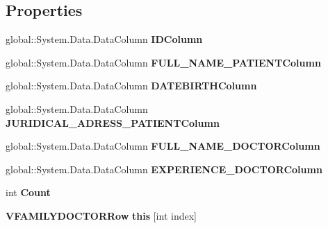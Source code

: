 \subsection*{Properties}
\begin{CompactItemize}
\item 
global::System.Data.DataColumn \textbf{IDColumn}\hspace{0.3cm}{\tt  [get]}\label{class_automatic_medical_system_1_1_data_set2_1_1_v_f_a_m_i_l_y_d_o_c_t_o_r_data_table_41c9dea202f3c850946c823c481c691f}

\item 
global::System.Data.DataColumn \textbf{FULL\_\-NAME\_\-PATIENTColumn}\hspace{0.3cm}{\tt  [get]}\label{class_automatic_medical_system_1_1_data_set2_1_1_v_f_a_m_i_l_y_d_o_c_t_o_r_data_table_852202fdb684abc22d7af9d01edefa8e}

\item 
global::System.Data.DataColumn \textbf{DATEBIRTHColumn}\hspace{0.3cm}{\tt  [get]}\label{class_automatic_medical_system_1_1_data_set2_1_1_v_f_a_m_i_l_y_d_o_c_t_o_r_data_table_1cf4543a4d2cf4f3832d5fba2c204aef}

\item 
global::System.Data.DataColumn \textbf{JURIDICAL\_\-ADRESS\_\-PATIENTColumn}\hspace{0.3cm}{\tt  [get]}\label{class_automatic_medical_system_1_1_data_set2_1_1_v_f_a_m_i_l_y_d_o_c_t_o_r_data_table_31857358c912dbd76e422b8741008e0d}

\item 
global::System.Data.DataColumn \textbf{FULL\_\-NAME\_\-DOCTORColumn}\hspace{0.3cm}{\tt  [get]}\label{class_automatic_medical_system_1_1_data_set2_1_1_v_f_a_m_i_l_y_d_o_c_t_o_r_data_table_265f9f9138ef8aa4b6fe371ad16719f9}

\item 
global::System.Data.DataColumn \textbf{EXPERIENCE\_\-DOCTORColumn}\hspace{0.3cm}{\tt  [get]}\label{class_automatic_medical_system_1_1_data_set2_1_1_v_f_a_m_i_l_y_d_o_c_t_o_r_data_table_168195e6598ed3f6b8410a1762f9fc86}

\item 
int \textbf{Count}\hspace{0.3cm}{\tt  [get]}\label{class_automatic_medical_system_1_1_data_set2_1_1_v_f_a_m_i_l_y_d_o_c_t_o_r_data_table_f52b48965183de2fd69e21cac01de9c0}

\item 
{\bf VFAMILYDOCTORRow} \textbf{this} [int index]\hspace{0.3cm}{\tt  [get]}\label{class_automatic_medical_system_1_1_data_set2_1_1_v_f_a_m_i_l_y_d_o_c_t_o_r_data_table_a638498be545d0d6cc7abd89506ada51}

\end{CompactItemize}
